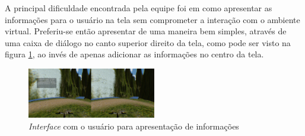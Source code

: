 A principal dificuldade encontrada pela equipe foi em como apresentar as informações para o usuário na tela sem comprometer a interação com o ambiente virtual. Preferiu-se então apresentar de uma maneira bem simples, através de uma caixa de diálogo no canto superior direito da tela, como pode ser visto na figura \ref{fig:improvedInterface}, ao invés de apenas adicionar as informações no centro da tela.


\begin{figure}[h]
  \centering
  \includegraphics[width=0.5\textwidth]{figuras/improvedInterface}
  \caption{\textit{Interface} com o usuário para apresentação de informações}
  \label{fig:improvedInterface}
\end{figure}

